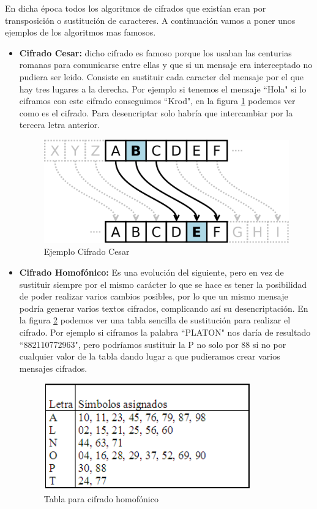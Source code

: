 	En dicha época todos los algoritmos de cifrados que existían eran por transposición o sustitución de caracteres. A continuación vamos a poner unos ejemplos de los algoritmos mas famosos. 
\begin{itemize}
	\item \textbf{Cifrado Cesar:} dicho cifrado es famoso porque los usaban las centurias romanas para comunicarse entre ellas y que si un mensaje era interceptado no pudiera ser leido. Consiste en sustituir cada caracter del mensaje por el que hay tres lugares a la derecha. Por ejemplo si tenemos el mensaje ``Hola" si lo ciframos con este cifrado conseguimos ``Krod", en la figura \ref{fig:cifradoCesar} podemos ver como es el cifrado.
	Para desencriptar solo habría que intercambiar por la tercera letra anterior.
\begin{figure}
  \centering
    \includegraphics[scale=0.6]{./ConocimientosPrevios/imagenes/cifradoCesar.png}
  \caption{Ejemplo Cifrado Cesar}
  \label{fig:cifradoCesar}
\end{figure} 
	
	\item \textbf{Cifrado Homofónico:} Es una evolución del siguiente, pero en vez de sustituir siempre por el mismo carácter lo que se hace es tener la posibilidad de poder realizar varios cambios posibles, por lo que un mismo mensaje podría generar varios textos cifrados, complicando así su desencriptación. En la figura \ref{fig:cifradoHomofonico} podemos ver una tabla sencilla de sustitución para realizar el cifrado. Por ejemplo si ciframos la palabra ``PLATON" nos daría de resultado ``882110772963", pero podríamos sustituir la P no solo por 88 si no por cualquier valor de la tabla dando lugar a que pudieramos crear varios mensajes cifrados.
	
\begin{figure}
  \centering
    \includegraphics[scale=0.7]{./ConocimientosPrevios/imagenes/cifradoHomofonico.png}
  \caption{Tabla para cifrado homofónico}
  \label{fig:cifradoHomofonico}
\end{figure}


\end{itemize}
